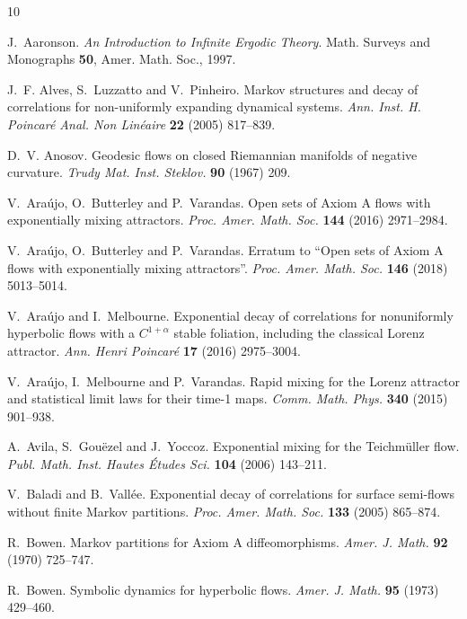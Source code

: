 \documentclass[12pt]{article}
\numberwithin{equation}{section}
\begin{document}
\begin{thebibliography}{10}

J.~Aaronson. \emph{{An Introduction to Infinite Ergodic Theory}}. Math. Surveys
  and Monographs \textbf{50}, Amer. Math. Soc., 1997.

J.~F. Alves, S.~Luzzatto and V.~Pinheiro. Markov structures and decay of
  correlations for non-uniformly expanding dynamical systems. \emph{Ann. Inst.
  H. Poincar\'e Anal. Non Lin\'eaire} \textbf{22} (2005) 817--839.

D.~V. Anosov. Geodesic flows on closed {R}iemannian manifolds of negative
  curvature. \emph{Trudy Mat. Inst. Steklov.} \textbf{90} (1967) 209.

V.~Ara{\'u}jo, O.~Butterley and P.~Varandas. Open sets of {A}xiom {A} flows
  with exponentially mixing attractors. \emph{Proc. Amer. Math. Soc.}
  \textbf{144} (2016) 2971--2984.

V.~Ara\'{u}jo, O.~Butterley and P.~Varandas. Erratum to ``{O}pen sets of
  {A}xiom {A} flows with exponentially mixing attractors''. \emph{Proc. Amer.
  Math. Soc.} \textbf{146} (2018) 5013--5014.

V.~Ara{\'u}jo and I.~Melbourne. Exponential decay of correlations for
  nonuniformly hyperbolic flows with a {$C^{1+\alpha}$} stable foliation,
  including the classical {L}orenz attractor. \emph{Ann. Henri Poincar\'e}
  \textbf{17} (2016) 2975--3004.

V.~Ara{\'u}jo, I.~Melbourne and P.~Varandas. Rapid mixing for the {L}orenz
  attractor and statistical limit laws for their time-1 maps. \emph{Comm. Math.
  Phys.} \textbf{340} (2015) 901--938.

A.~Avila, S.~Gou{\"e}zel and J.~Yoccoz. Exponential mixing for the
  {T}eichm\"uller flow. \emph{Publ. Math. Inst. Hautes \'Etudes Sci.}
  \textbf{104} (2006) 143--211.

V.~Baladi and B.~Vall{\'e}e. Exponential decay of correlations for surface
  semi-flows without finite {M}arkov partitions. \emph{Proc. Amer. Math. Soc.}
  \textbf{133} (2005) 865--874.

R.~Bowen. {Markov partitions for Axiom A diffeomorphisms}. \emph{Amer. J.
  Math.} \textbf{92} (1970) 725--747.

R.~Bowen. {Symbolic dynamics for hyperbolic flows}. \emph{Amer. J. Math.}
  \textbf{95} (1973) 429--460.


\end{thebibliography}
\end{document}

